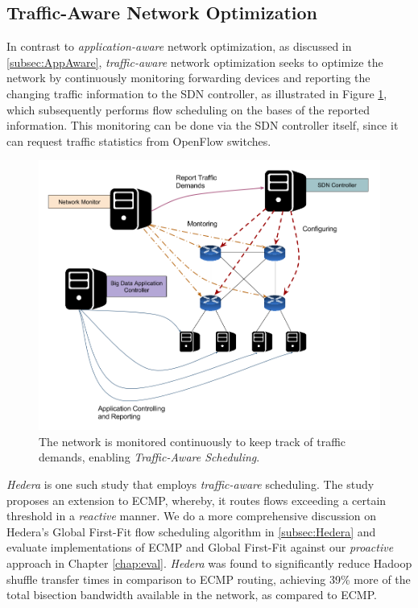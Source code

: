 \subsection{Traffic-Aware Network Optimization}

In contrast to \textit{application-aware} network optimization, as discussed in \ref{subsec:AppAware}, \textit{traffic-aware} network optimization seeks to optimize the network by continuously monitoring forwarding devices and reporting the changing traffic information to the SDN controller, as illustrated in Figure \ref{fig:TrafficAwareScheduling}, which subsequently performs flow scheduling on the bases of the reported information. This monitoring can be done via the SDN controller itself, since it can request traffic statistics from OpenFlow switches. 

\begin{figure}[!ht] 
	\centerline{\includegraphics[scale=0.40]{graphics/chapter2/TrafficAwareScheduling.png}}
	\caption{The network is monitored continuously to keep track of traffic demands, enabling \textit{Traffic-Aware Scheduling}.}
	\label{fig:TrafficAwareScheduling}
\end{figure}

\textit{Hedera} \cite{al2010hedera} is one such study that employs \textit{traffic-aware} scheduling. The study proposes an extension to ECMP, whereby, it routes flows exceeding a certain threshold in a \textit{reactive} manner. We do a more comprehensive discussion on Hedera's Global First-Fit flow scheduling algorithm in \ref{subsec:Hedera} and evaluate implementations of ECMP and Global First-Fit against our \textit{proactive} approach in Chapter \ref{chap:eval}. \textit{Hedera} was found to significantly reduce Hadoop shuffle transfer times in comparison to ECMP routing, achieving 39\% more of the total bisection bandwidth available in the network, as compared to ECMP.

